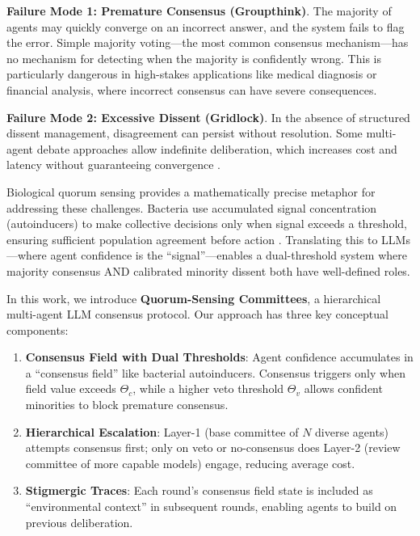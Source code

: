 \documentclass[11pt,letterpaper]{article}
\begin{document}
\textbf{Failure Mode 1: Premature Consensus (Groupthink)}. The majority of agents may quickly converge on an incorrect answer, and the system fails to flag the error. Simple majority voting---the most common consensus mechanism---has no mechanism for detecting when the majority is confidently wrong. This is particularly dangerous in high-stakes applications like medical diagnosis or financial analysis, where incorrect consensus can have severe consequences.

\textbf{Failure Mode 2: Excessive Dissent (Gridlock)}. In the absence of structured dissent management, disagreement can persist without resolution. Some multi-agent debate approaches allow indefinite deliberation, which increases cost and latency without guaranteeing convergence \cite{Zhang2023}.

Biological quorum sensing provides a mathematically precise metaphor for addressing these challenges. Bacteria use accumulated signal concentration (autoinducers) to make collective decisions only when signal exceeds a threshold, ensuring sufficient population agreement before action \cite{Miller2001}. Translating this to LLMs---where agent confidence is the ``signal''---enables a dual-threshold system where majority consensus AND calibrated minority dissent both have well-defined roles.

In this work, we introduce \textbf{Quorum-Sensing Committees}, a hierarchical multi-agent LLM consensus protocol. Our approach has three key conceptual components:

\begin{enumerate}
\item \textbf{Consensus Field with Dual Thresholds}: Agent confidence accumulates in a ``consensus field'' like bacterial autoinducers. Consensus triggers only when field value exceeds $\Theta_c$, while a higher veto threshold $\Theta_v$ allows confident minorities to block premature consensus.

\item \textbf{Hierarchical Escalation}: Layer-1 (base committee of $N$ diverse agents) attempts consensus first; only on veto or no-consensus does Layer-2 (review committee of more capable models) engage, reducing average cost.

\item \textbf{Stigmergic Traces}: Each round's consensus field state is included as ``environmental context'' in subsequent rounds, enabling agents to build on previous deliberation.
\end{enumerate}
\end{document}
